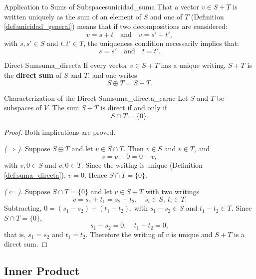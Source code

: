 \documentclass[11pt, a4paper]{article}
\begin{document}
\begin{ejemplo}{Application to Sums of Subspaces}{unicidad_suma}
That a vector $v \in S+T$ is written uniquely as the sum of an element of $S$ and one of $T$ (Definition \ref{def:unicidad_general}) means that if two decompositions are considered:
\[
v = s + t \quad \text{and} \quad v = s' + t',
\]
with $s, s' \in S$ and $t, t' \in T$, the uniqueness condition necessarily implies that:
\[
s = s' \quad \text{and} \quad t = t'.
\]
\end{ejemplo}

\begin{definicion}{Direct Sum}{suma_directa}
If every vector $v \in S+T$ has a unique writing, $S+T$ is the \textbf{direct sum} of $S$ and $T$, and one writes
\[
S \oplus T = S+T.
\]
\end{definicion}

\begin{proposicion}{Characterization of the Direct Sum}{suma_directa_carac}
Let $S$ and $T$ be subspaces of $V$. The sum $S+T$ is direct if and only if
\[
S \cap T = \{0\}.
\]
\end{proposicion}

\begin{proof}
Both implications are proved.

\textit{($\Rightarrow$).} Suppose $S \oplus T$ and let $v \in S \cap T$. Then $v \in S$ and $v \in T$, and
\[
v = v + 0 = 0 + v,
\]
with $v, 0 \in S$ and $v, 0 \in T$. Since the writing is unique (Definition \ref{def:suma_directa}), $v = 0$. Hence $S \cap T = \{0\}$.

\textit{($\Leftarrow$).} Suppose $S \cap T = \{0\}$ and let $v \in S+T$ with two writings
\[
v = s_1 + t_1 = s_2 + t_2, \quad s_i \in S, \ t_i \in T.
\]
Subtracting, $0 = (s_1 - s_2) + (t_1 - t_2)$, with $s_1 - s_2 \in S$ and $t_1 - t_2 \in T$. Since $S \cap T = \{0\}$,
\[
s_1 - s_2 = 0, \quad t_1 - t_2 = 0,
\]
that is, $s_1 = s_2$ and $t_1 = t_2$. Therefore the writing of $v$ is unique and $S+T$ is a direct sum.
\end{proof}

\subsection{Inner Product}
\end{document}
